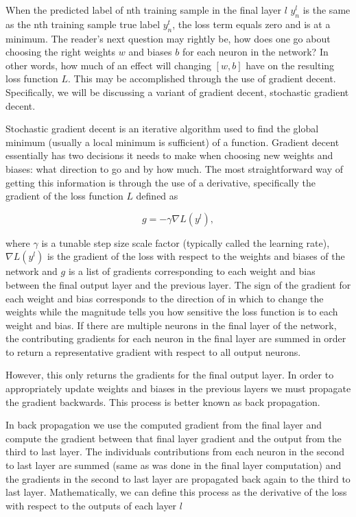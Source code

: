 %
%
When the predicted label of nth training sample in the final layer $l$ $y^{l}_n$ is the same as the nth training sample true label $y^{t}_n$, the loss term equals zero and is at a minimum. The reader's next question may rightly be, how does one go about choosing the right weights $w$ and biases $b$ for each neuron in the network? In other words, how much of an effect will changing $[w,b]$ have on the resulting loss function $L$. This may be accomplished through the use of gradient decent. Specifically, we will be discussing a variant of gradient decent, stochastic gradient decent.

%
%
Stochastic gradient decent is an iterative algorithm used to find the global minimum (usually a local minimum is sufficient) of a function. Gradient decent essentially has two decisions it needs to make when choosing new weights and biases: what direction to go and by how much. The most straightforward way of getting this information is through the use of a derivative, specifically the gradient of the loss function $L$ defined as 

\begin{equation}
    g = - \gamma \nabla L(y^{l}),
\end{equation}{}

where $\gamma$ is a tunable step size scale factor (typically called the learning rate), $\nabla L(y^{l})$ is the gradient of the loss with respect to the weights and biases of the network and $g$ is a list of gradients corresponding to each weight and bias between the final output layer and the previous layer. The sign of the gradient for each weight and bias corresponds to the direction of in which to change the weights while the magnitude tells you how sensitive the loss function is to each weight and bias. If there are multiple neurons in the final layer of the network, the contributing gradients for each neuron in the final layer are summed in order to return a representative gradient with respect to all output neurons.

However, this only returns the gradients for the final output layer. In  order to appropriately update weights and biases in the previous layers we must propagate the gradient backwards. This process is better known as back propagation.

%
%
In back propagation we use the computed gradient from the final layer and compute the gradient between that final layer gradient and the output from the third to last layer. The individuals contributions from each neuron in the second to last layer are summed (same as was done in the final layer computation) and the gradients in the second to last layer are propagated back again to the third to last layer. Mathematically, we can define this process as the derivative of the loss with respect to the outputs of each layer $l$

